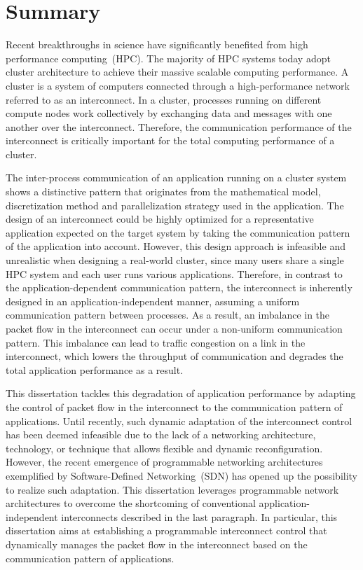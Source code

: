 \pagestyle{myheadings}
\markright{}
\chapter*{Summary}

Recent breakthroughs in science have significantly benefited from high
performance computing~(HPC). The majority of HPC systems today adopt cluster
architecture to achieve their massive scalable computing performance. A
cluster is a system of computers connected through a high-performance network
referred to as an interconnect. In a cluster, processes running on different
compute nodes work collectively by exchanging data and messages with one
another over the interconnect. Therefore, the communication performance of the
interconnect is critically important for the total computing performance of a
cluster.

The inter-process communication of an application running on a cluster system
shows a distinctive pattern that originates from the mathematical model,
discretization method and parallelization strategy used in the application.
The design of an interconnect could be highly optimized for a representative
application expected on the target system by taking the communication pattern
of the application into account. However, this design approach is infeasible
and unrealistic when designing a real-world cluster, since many users share a
single HPC system and each user runs various applications. Therefore, in
contrast to the application-dependent communication pattern, the interconnect
is inherently designed in an application-independent manner, assuming a
uniform communication pattern between processes. As a result, an imbalance in
the packet flow in the interconnect can occur under a non-uniform
communication pattern. This imbalance can lead to traffic congestion on a link
in the interconnect, which lowers the throughput of communication and degrades
the total application performance as a result.

This dissertation tackles this degradation of application performance by
adapting the control of packet flow in the interconnect to the communication
pattern of applications. Until recently, such dynamic adaptation of the
interconnect control has been deemed infeasible due to the lack of a
networking architecture, technology, or technique that allows flexible and
dynamic reconfiguration. However, the recent emergence of programmable
networking architectures exemplified by Software-Defined Networking~(SDN) has
opened up the possibility to realize such adaptation. This dissertation
leverages programmable network architectures to overcome the shortcoming of
conventional application-independent interconnects described in the last
paragraph. In particular, this dissertation aims at establishing a
programmable interconnect control that dynamically manages the packet flow in
the interconnect based on the communication pattern of applications.

